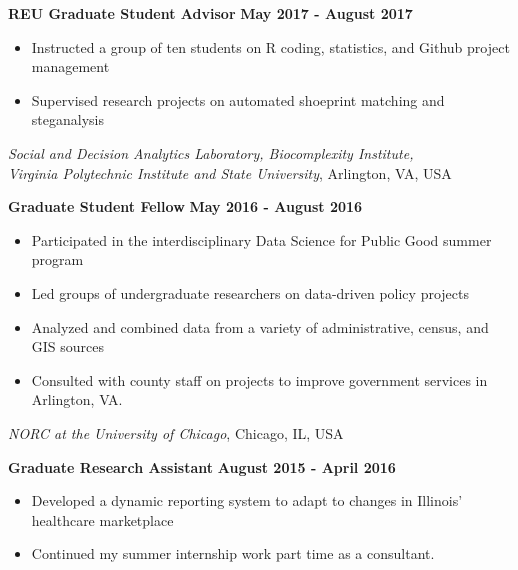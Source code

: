 \documentclass[margin,line]{res}
\begin{document}
\begin{resume}
\vspace{-.3cm}

{\bf REU Graduate Student Advisor} \hfill {\bf May 2017 - August 2017}\\
\vspace{-.3cm}
\begin{itemize}
\setlength\itemsep{0em}
\item Instructed a group of ten students on R coding, statistics, and Github project management 
\item Supervised research projects on automated shoeprint matching and steganalysis
\end{itemize} 

{\em Social and Decision Analytics Laboratory, Biocomplexity Institute, \\ Virginia Polytechnic Institute and State University}, Arlington, VA, USA

\vspace{-.3cm}

{\bf Graduate Student Fellow} \hfill {\bf May 2016 - August 2016}\\
\vspace{-.3cm}
\begin{itemize}
\setlength\itemsep{0em}
\item Participated in the interdisciplinary Data Science for Public Good summer program
\item Led groups of undergraduate researchers on data-driven policy projects
\item Analyzed and combined data from a variety of administrative, census, and GIS sources 
\item Consulted with county staff on projects to improve government services in Arlington, VA.
\end{itemize}


{\em NORC at the University of Chicago}, Chicago, IL, USA

\vspace{-.3cm}

{\bf Graduate Research Assistant} \hfill {\bf August 2015 - April 2016}\\
\vspace{-.3cm}
\begin{itemize}
\setlength\itemsep{0em}
\item Developed a dynamic reporting system to adapt to changes in Illinois' healthcare marketplace  
\item Continued my summer internship work part time as a consultant.  
\end{itemize}


\end{resume}
\end{document}
